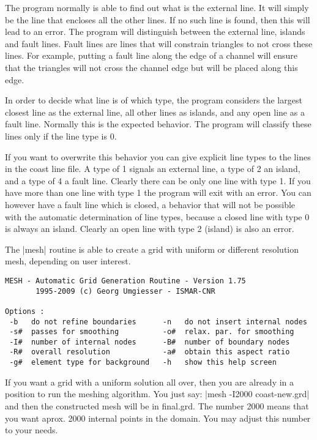 The program normally is able to find out what is the external line. It
will simply be the line that encloses all the other lines. If no such line
is found, then this will lead to an error. The program will distinguish
between the external line, islands and fault lines. Fault lines are lines
that will constrain triangles to not cross these lines. For example,
putting a fault line along the edge of a channel will ensure that the
triangles will not cross the channel edge but will be placed along
this edge.

In order to decide what line is of which type, the program considers the
largest closest line as the external line, all other lines as islands, and
any open line as a fault line. Normally this is the expected behavior. The
program will classify these lines only if the line type is 0.

If you want to overwrite this behavior you can give explicit line types to
the lines in the coast line file. A type of 1 signals an external line,
a type of 2 an island, and a type of 4 a fault line. Clearly there can
be only one line with type 1. If you have more than one line with type
1 the program will exit with an error. You can however have a fault line
which is closed, a behavior that will not be possible with the automatic
determination of line types, because a closed line with type 0 is always
an island. Clearly an open line with type 2 (island) is also an error.


The |mesh| routine is able to create a grid with uniform or  
different resolution mesh, depending on user interest.

\begin{verbatim}
MESH - Automatic Grid Generation Routine - Version 1.75 
       1995-2009 (c) Georg Umgiesser - ISMAR-CNR        

Options :
 -b   do not refine boundaries      -n   do not insert internal nodes
 -s#  passes for smoothing          -o#  relax. par. for smoothing   
 -I#  number of internal nodes      -B#  number of boundary nodes    
 -R#  overall resolution            -a#  obtain this aspect ratio    
 -g#  element type for background   -h   show this help screen  
\end{verbatim}


If you want a grid with a uniform solution all over, then
you are already in a position to run the meshing algorithm.
You just say: |mesh -I2000 coast-new.grd| and then
the constructed mesh will be in final.grd. The number 2000
means that you want aprox. 2000 internal points in the domain.
You may adjust this number to your needs.

